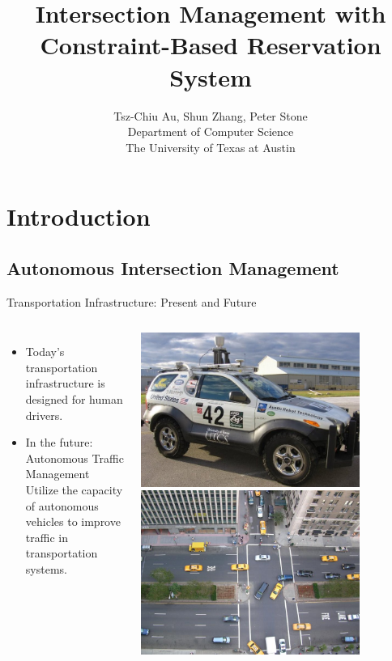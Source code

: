 \documentclass{beamer}
\title{Intersection Management with Constraint-Based Reservation
System}
\author{Tsz-Chiu Au, Shun Zhang, Peter Stone\\ Department of Computer
Science\\ The University of Texas at Austin}
\begin{document}
\begin{frame}
\titlepage
\end{frame}

\section{Introduction}

\subsection{Autonomous Intersection Management}

\begin{frame}{Transportation Infrastructure: Present and Future}
\begin{columns}[c]
		\begin{itemize}
		\item Today’s transportation infrastructure is designed for
		human drivers.
		\item In the future: Autonomous Traffic Management\\
		Utilize the capacity of autonomous vehicles to improve traffic
		in transportation systems.
		\end{itemize}
		
		\includegraphics[width=0.8\textwidth]{42.png}
		\hfill
		\includegraphics[width=0.8\textwidth]{intersection.jpg}
\end{columns}
\end{frame}
\end{document}
